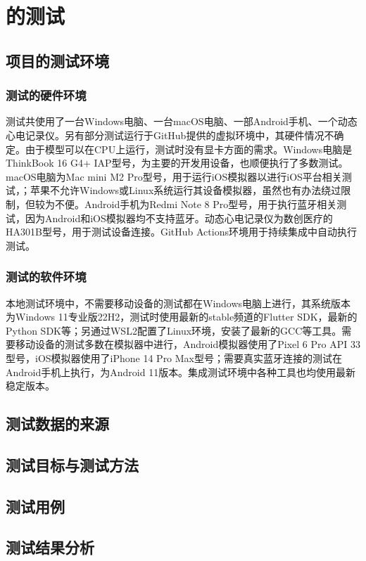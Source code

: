 \chapter{\app 的测试}\label{ch:test}


\section{项目的测试环境}\label{sec:test-env}

\subsection{测试的硬件环境}\label{subsec:test-hardware}

测试共使用了一台Windows电脑、一台macOS电脑、一部Android手机、一个动态心电记录仪。另有部分测试运行于GitHub提供的虚拟环境中，其硬件情况不确定。由于模型可以在CPU上运行，测试时没有显卡方面的需求。Windows电脑是ThinkBook 16 G4+ IAP型号，为主要的开发用设备，也顺便执行了多数测试。macOS电脑为Mac mini M2 Pro型号，用于运行iOS模拟器以进行iOS平台相关测试，；苹果不允许Windows或Linux系统运行其设备模拟器，虽然也有办法绕过限制，但较为不便。Android手机为Redmi Note 8 Pro型号，用于执行蓝牙相关测试，因为Android和iOS模拟器均不支持蓝牙。动态心电记录仪为数创医疗的HA301B型号，用于测试设备连接。GitHub Actions环境用于持续集成中自动执行测试。

\subsection{测试的软件环境}\label{subsec:test-software}

本地测试环境中，不需要移动设备的测试都在Windows电脑上进行，其系统版本为Windows 11专业版22H2，测试时使用最新的stable频道的Flutter SDK，最新的Python SDK等；另通过WSL2配置了Linux环境，安装了最新的GCC等工具。需要移动设备的测试多数在模拟器中进行，Android模拟器使用了Pixel 6 Pro API 33型号，iOS模拟器使用了iPhone 14 Pro Max型号；需要真实蓝牙连接的测试在Android手机上执行，为Android 11版本。集成测试环境中各种工具也均使用最新稳定版本。


\section{测试数据的来源}\label{sec:test-data}



\section{测试目标与测试方法}\label{sec:test-target}



\section{测试用例}\label{sec:test-case}



\section{测试结果分析}\label{sec:test-result}

